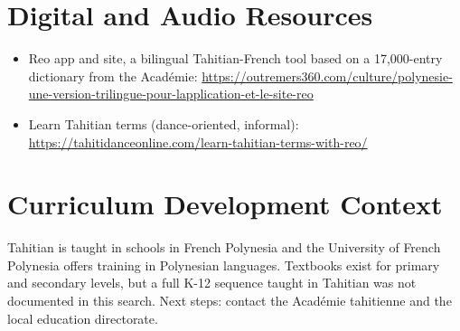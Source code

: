 \documentclass[12pt]{article}
\begin{document}
\section{Digital and Audio Resources}
\begin{itemize}
\item Reo app and site, a bilingual Tahitian-French tool based on a 17,000-entry dictionary from the Acad\'emie: \url{https://outremers360.com/culture/polynesie-une-version-trilingue-pour-lapplication-et-le-site-reo}
\item Learn Tahitian terms (dance-oriented, informal): \url{https://tahitidanceonline.com/learn-tahitian-terms-with-reo/}
\end{itemize}

\section{Curriculum Development Context}
Tahitian is taught in schools in French Polynesia and the University of French Polynesia offers training in Polynesian languages. Textbooks exist for primary and secondary levels, but a full K-12 sequence taught in Tahitian was not documented in this search. Next steps: contact the Acad\'emie tahitienne and the local education directorate.
\end{document}
